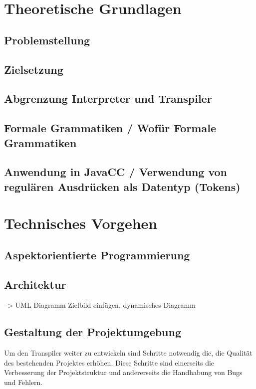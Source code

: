 \section{Theoretische Grundlagen}
	\subsection{Problemstellung}
	\subsection{Zielsetzung}
	\subsection{Abgrenzung Interpreter und Transpiler}
	\subsection{Formale Grammatiken / Wofür Formale Grammatiken}
	\subsection{Anwendung in JavaCC / Verwendung von regulären Ausdrücken als Datentyp (Tokens)}

\section{Technisches Vorgehen}
\subsection{Aspektorientierte Programmierung}
\subsection{Architektur} 
--> UML Diagramm Zielbild einfügen, dynamisches Diagramm
\subsection{Gestaltung der Projektumgebung}
Um den Transpiler weiter zu entwickeln sind Schritte notwendig die, die Qualität des bestehenden Projektes erhöhen. Diese Schritte sind einerseits die Verbesserung der Projektstruktur und andererseits die Handhabung von Bugs und Fehlern.

